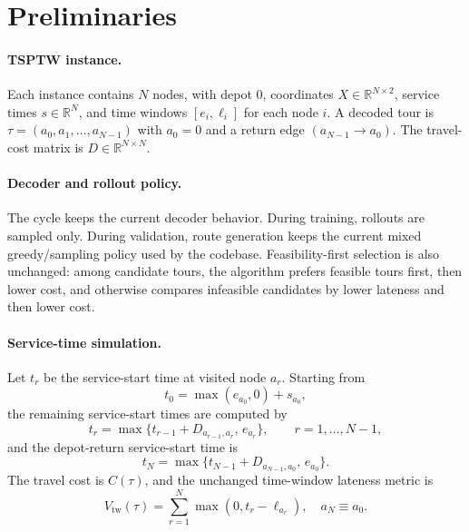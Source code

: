 \documentclass{article}
\begin{document}

\begin{abstract}
This cycle replaces the previous edge-only ADMM consensus target with a time-expanded occupancy tensor whose entries mean ``travel from node $i$ to node $j$ at time bin $b$''. The outer training and validation loop remains ACADMM-style, the rollout decoder and selection rule remain unchanged, and the validation metrics remain unchanged. The main methodological change is that the ADMM state is maintained in occupancy space, while the neural kernels consume only edge-marginal summaries of that state so the current batch-parallel implementation is preserved. In addition, the training step adds a direct occupancy alignment loss on the NAR score matrix so consensus pressure is not carried only through sampled-route rewards.
\end{abstract}

\section{Preliminaries}
\paragraph{TSPTW instance.}
Each instance contains $N$ nodes, with depot $0$, coordinates $X\in\mathbb{R}^{N\times 2}$, service times $s\in\mathbb{R}^N$, and time windows $[e_i,\ell_i]$ for each node $i$. A decoded tour is $\tau=(a_0,a_1,\ldots,a_{N-1})$ with $a_0=0$ and a return edge $(a_{N-1}\!\to\! a_0)$. The travel-cost matrix is $D\in\mathbb{R}^{N\times N}$.

\paragraph{Decoder and rollout policy.}
The cycle keeps the current decoder behavior. During training, rollouts are sampled only. During validation, route generation keeps the current mixed greedy/sampling policy used by the codebase. Feasibility-first selection is also unchanged: among candidate tours, the algorithm prefers feasible tours first, then lower cost, and otherwise compares infeasible candidates by lower lateness and then lower cost.

\paragraph{Service-time simulation.}
Let $t_r$ be the service-start time at visited node $a_r$. Starting from
\[
t_0=\max(e_{a_0},0)+s_{a_0},
\]
the remaining service-start times are computed by
\[
t_r=\max\{t_{r-1}+D_{a_{r-1},a_r},\,e_{a_r}\},
\qquad r=1,\ldots,N-1,
\]
and the depot-return service-start time is
\[
t_N=\max\{t_{N-1}+D_{a_{N-1},a_0},\,e_{a_0}\}.
\]
The travel cost is $C(\tau)$, and the unchanged time-window lateness metric is
\[
V_{\mathrm{tw}}(\tau)=\sum_{r=1}^{N}\max(0,t_r-\ell_{a_r}),
\quad a_N\equiv a_0.
\]
\end{document}
